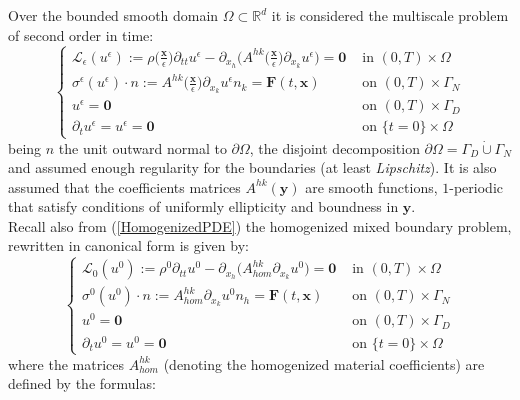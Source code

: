 Over the bounded smooth domain $\Omega \subset \mathbb{R}^d$ it is considered the multiscale problem of second order in time:
\begin{equation}
    \label{MainMultiPDE}
    \left \{
    \begin{array}{cc}
        \mathcal{L}_{\epsilon}(u^{\epsilon}) := \rho\big( \frac{\mathbf{x}}{\epsilon} \big) \partial_{tt} u^{\epsilon} - \partial_{x_h} \big( A^{hk}\big( \frac{\mathbf{x}}{\epsilon} \big) \partial_{x_k} u^{\epsilon} \big)  = \mathbf{0} & \text{ in } (0,T)\times \Omega  \\
        \sigma^{\epsilon}(u^{\epsilon})\cdot n := A^{hk}\big( \frac{\mathbf{x}}{\epsilon} \big) \partial_{x_k} u^{\epsilon} n_k  = \mathbf{F}(t,\mathbf{x}) & \text{ on } (0,T) \times \Gamma_N \\
        u^{\epsilon} =  \mathbf{0} & \text{ on } (0,T) \times \Gamma_D \\
        \partial_t u^{\epsilon} = u^{\epsilon} = \mathbf{0} & \text{ on } \{ t=0 \} \times \Omega 
    \end{array}
    \right.
\end{equation}
being $n$ the unit outward normal to $\partial \Omega$, the disjoint decomposition $\partial \Omega = \Gamma_D \dot \cup \Gamma_N$ and assumed enough regularity for the boundaries (at least \textit{Lipschitz}). It is also assumed that the coefficients matrices $A^{hk}(\mathbf{y})$ are smooth functions, $1$-periodic that satisfy conditions of uniformly ellipticity and boundness in $\mathbf{y}$.\\
Recall also from (\ref{HomogenizedPDE}) the homogenized mixed boundary problem, rewritten in canonical form is given by:
\begin{equation}
    \label{HomMultiPDE}
    \left \{
    \begin{array}{ccc}
        \mathcal{L}_0 (u^0) := \rho^0 \partial_{tt} u^0 - \partial_{x_h}\big( A^{hk}_{hom} \partial_{x_k} u^0 \big) = \mathbf{0} & \text{ in } (0,T)\times \Omega \\
        \sigma^0(u^0) \cdot n := A^{hk}_{hom} \partial_{x_k}u^0 n_h = \mathbf{F}(t, \mathbf{x}) & \text{ on } (0,T) \times \Gamma_N \\
        u^0 = \mathbf{0} & \text{ on } (0,T) \times \Gamma_D \\
        \partial_t u^0 = u^0 = \mathbf{0} & \text{ on } \{ t=0 \} \times \Omega
    \end{array}
    \right .
\end{equation}
where the matrices $A^{hk}_{hom}$ (denoting the homogenized material coefficients) are defined by the formulas:
